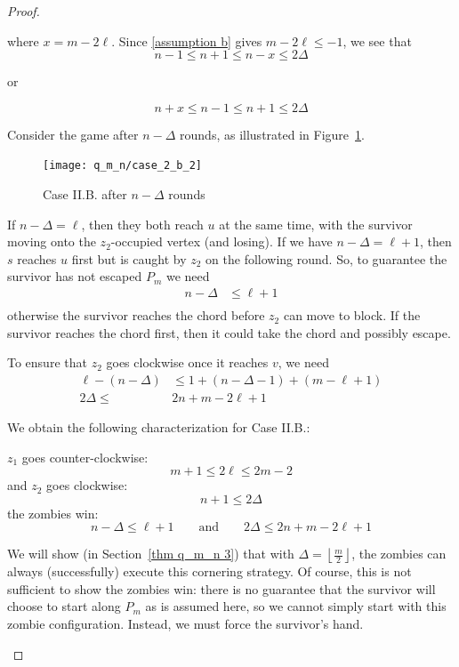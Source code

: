 \begin{proof}
\begin{proofpart}
\begin{itemize}
  where $x = m -2\ell$. Since \ref{assumption b} gives $m - 2\ell \leq -1$, we
  see that
  \[ n-1 \leq n+1 \leq n-x \leq 2 \Delta \]
  \begin{center}or\end{center}
  \[ n+x \leq n-1 \leq n+1 \leq 2 \Delta \]

  Consider the game after $n-\Delta$ rounds, as illustrated in Figure~\ref{fig:case_2_b_2}.
  \begin{figure}
    \centering
    \texttt{[image: q\_m\_n/case\_2\_b\_2]}
    \caption{Case II.B. after $n-\Delta$ rounds \label{fig:case_2_b_2}}
  \end{figure}

  If $n - \Delta = \ell$, then they both reach $u$ at the same time,
  with the survivor moving onto the $z_2$-occupied vertex (and losing).
  If we have $n - \Delta = \ell + 1$, then $s$ reaches $u$ first
  but is caught by $z_2$ on the following round.
  So, to guarantee the survivor has not escaped $P_m$ we need
  \begin{align*}
   n - \Delta &\leq \ell + 1 \\
  \end{align*}
  otherwise the survivor reaches the chord before $z_2$ can move
  to block. If the survivor reaches the chord first, then it could
  take the chord and possibly escape.

  To ensure that $z_2$ goes clockwise once it reaches $v$, we need
  \begin{align*}
   \ell - (n - \Delta) &\leq 1 + (n - \Delta - 1) + (m - \ell + 1) \\
   2 \Delta \leq            & 2n + m - 2\ell + 1
  \end{align*}

  We obtain the following characterization for Case II.B.:

  $z_1$ goes counter-clockwise:
  \[ m + 1 \leq 2 \ell \leq 2m - 2 \]
  and $z_2$ goes clockwise:
  \[ n+1 \leq 2 \Delta \]
  the zombies win:
  \[ n - \Delta \leq \ell + 1 \qquad \text{and} \qquad 2 \Delta \leq 2n + m - 2\ell + 1 \]

\end{itemize}

We will show (in Section~\ref{thm q_m_n 3}) that with $\Delta = \left\lfloor \frac{m}{2} \right\rfloor$, the zombies can always (successfully) execute this cornering strategy. Of course, this is not sufficient to show the zombies win: there is no guarantee that the survivor will choose to start along $P_m$ as is assumed here, so we cannot simply start with this zombie configuration. Instead, we must force the survivor's hand.
\end{proofpart}


\end{proof}
